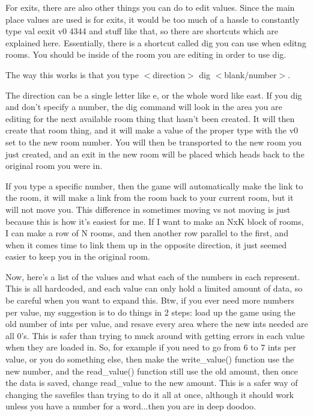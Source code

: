 For exits, there are also other things you can do to edit
values. Since the main place values are used is for exits, it would be
too much of a hassle to constantly type val eexit v0 4344 and stuff
like that, so there are shortcuts which are explained
here. Essentially, there is a shortcut called dig you can use when
editng rooms. You should be inside of the room you are editing in
order to use dig.

The way this works is that you type $<$direction$>$ dig $<$blank/number$>$.

The direction can be a single letter like e, or the whole word like
east. If you dig and don't specify a number, the dig command will look
in the area you are editing for the next available room thing that
hasn't been created. It will then create that room thing, and it will
make a value of the proper type with the v0 set to the new room
number. You will then be transported to the new room you just created,
and an exit in the new room will be placed which heads back to the
original room you were in.

If you type a specific number, then the game will automatically make
the link to the room, it will make a link from the room back to your
current room, but it will not move you. This difference in sometimes
moving vs not moving is just because this is how it's easiest for
me. If I want to make an NxK block of rooms, I can make a row of N
rooms, and then another row parallel to the first, and when it comes
time to link them up in the opposite direction, it just seemed easier
to keep you in the original room.


Now, here's a list of the values and what each of the numbers in each
represent. This is all hardcoded, and each value can only hold a
limited amount of data, so be careful when you want to expand
this. Btw, if you ever need more numbers per value, my suggestion is
to do things in 2 steps: load up the game using the old number of ints
per value, and resave every area where the new ints needed are all
0's. This is safer than trying to muck around with getting errors in
each value when they are loaded in. So, for example if you need to go
from 6 to 7 ints per value, or you do something else, then make the
write\_value() function use the new number, and the read\_value()
function still use the old amount, then once the data is saved, change
read\_value to the new amount. This is a safer way of changing the
savefiles than trying to do it all at once, although it should work
unless you have a number for a word...then you are in deep doodoo.

